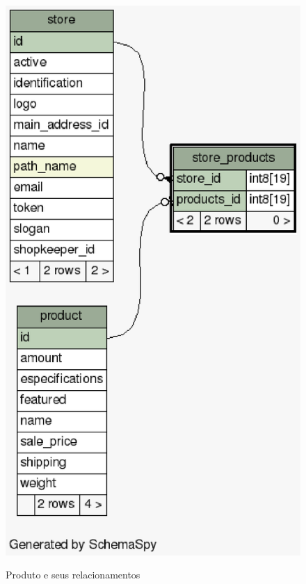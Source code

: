 \documentclass[a4paper,12pt]{monografia}
\begin{document}
\begin{figure}[H]
\centering
\caption{Produto e seus relacionamentos}
\centering
\includegraphics[scale=0.7]{img/diagramas/schema/store_products.1degree.png.eps}\\
\end{figure}
\end{document}
